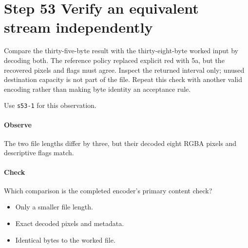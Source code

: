 \section{Step 53 Verify an equivalent stream independently}\label{qoi-s53}
Compare the thirty-five-byte result with the thirty-eight-byte worked input by decoding both. The reference policy replaced explicit red with 5a, but the recovered pixels and flags must agree. Inspect the returned interval only; unused destination capacity is not part of the file. Repeat this check with another valid encoding rather than making byte identity an acceptance rule.

Use \texttt{s53-1} for this observation.

\paragraph{Observe} The two file lengths differ by three, but their decoded eight RGBA pixels and descriptive flags match.

\paragraph{Check} Which comparison is the completed encoder’s primary content check?
\begin{itemize}
  \item[A.] Only a smaller file length.
  \item[B.] Exact decoded pixels and metadata.
  \item[C.] Identical bytes to the worked file.
\end{itemize}
